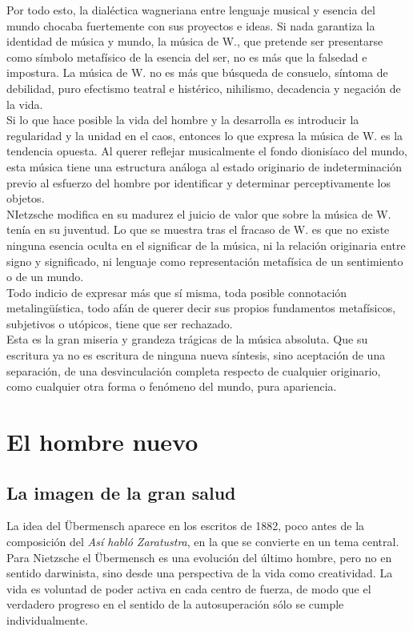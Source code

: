 \documentclass[a4paper, 10pt, twocolumn, spanish]{article}
\begin{document}
Por todo esto, la dialéctica wagneriana entre lenguaje musical y
esencia del mundo chocaba fuertemente con sus proyectos e ideas. Si
nada garantiza la identidad de música y mundo, la música de W., que
pretende ser presentarse como símbolo metafísico de la esencia del
ser, no es más que la falsedad e impostura. La música de W. no es más
que búsqueda de consuelo, síntoma de debilidad, puro efectismo teatral
e histérico, nihilismo, decadencia y negación de la vida.\\[0pt]
Si lo que hace posible la vida del hombre y la desarrolla es
introducir la regularidad y la unidad en el caos, entonces lo que
expresa la música de W. es la tendencia opuesta. Al querer reflejar
musicalmente el fondo dionisíaco del mundo, esta música tiene una
estructura análoga al estado originario de indeterminación previo al
esfuerzo del hombre por identificar y determinar perceptivamente los
objetos.\\[0pt]

NIetzsche modifica en su madurez el juicio de valor que sobre la
música de W. tenía en su juventud. Lo que se muestra tras el fracaso
de W. es que no existe ninguna esencia oculta en el significar de la
música, ni la relación originaria entre signo y significado, ni
lenguaje como representación metafísica de un sentimiento o de un
mundo.\\[0pt]
Todo indicio de expresar más que sí misma, toda posible connotación
metalingüística, todo afán de querer decir sus propios fundamentos
metafísicos, subjetivos o utópicos, tiene que ser rechazado.\\[0pt]
Esta es la gran miseria y grandeza trágicas de la música absoluta. Que
su escritura ya no es escritura de ninguna nueva síntesis, sino
aceptación de una separación, de una desvinculación completa respecto
de cualquier originario, como cualquier otra forma o fenómeno del
mundo, pura apariencia.


\section{El hombre nuevo}
\label{sec:org0037019}
\subsection{La imagen de la gran salud}
\label{sec:org2e838a2}
La idea del Übermensch aparece en los escritos de 1882, poco antes de
la composición del \emph{Así habló Zaratustra}, en la que se convierte en
un tema central.\\[0pt]
Para Nietzsche el Übermensch es una evolución del último hombre, pero
no en sentido darwinista, sino desde una perspectiva de la vida como
creatividad. La vida es voluntad de poder activa en cada centro de
fuerza, de modo que el verdadero progreso en el sentido de la
autosuperación sólo se cumple individualmente.\\[0pt]
\end{document}
